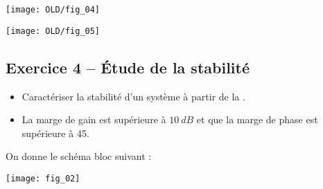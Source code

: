 \begin{multicols}{2}
%
%
%
\ifprof
\else
\begin{center}
\texttt{[image: OLD/fig\_04]}
\end{center}

\begin{center}
\texttt{[image: OLD/fig\_05]}
\end{center}
\fi



\subsection*{Exercice 4 -- Étude de la stabilité}
\setcounter{exo}{0}



\ifprof
\else

\begin{obj}
\begin{itemize}
\item Caractériser la stabilité d'un système à partir de la {}.
\item La marge de gain est supérieure à $\SI{10}{dB}$ et que la marge de phase est supérieure à \SI{45}{\degres}.
\end{itemize}

\end{obj}


On donne le schéma bloc suivant :

\begin{center}
\texttt{[image: fig\_02]}
\end{center}

\fi


\end{multicols}
